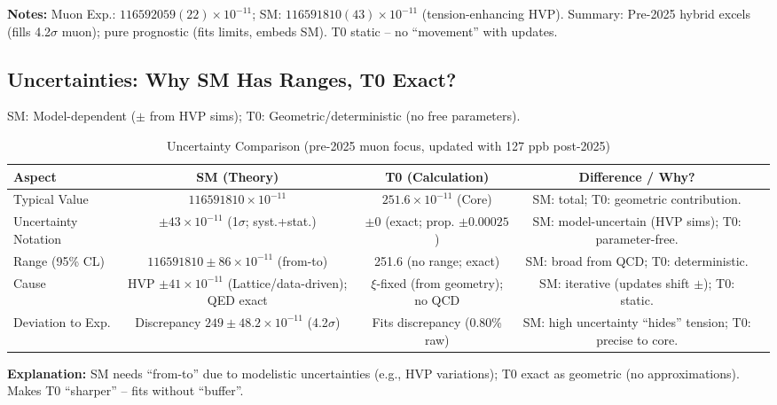 \documentclass[12pt,a4paper]{article}
\begin{document}
	\textbf{Notes:} Muon Exp.: $116592059(22) \times 10^{-11}$; SM: $116591810(43) \times 10^{-11}$ (tension-enhancing HVP). Summary: Pre-2025 hybrid excels (fills 4.2$\sigma$ muon); pure prognostic (fits limits, embeds SM). T0 static -- no ``movement'' with updates.
	
	\subsection{Uncertainties: Why SM Has Ranges, T0 Exact?}
	
	SM: Model-dependent ($\pm$ from HVP sims); T0: Geometric/deterministic (no free parameters).
	
	\begin{table}[ht!]
		\centering
		\small
		\begin{adjustbox}{max width=\textwidth}
			\begin{tabular}{lcccr}
				\toprule
				Aspect & SM (Theory) & T0 (Calculation) & Difference / Why? \\
				\midrule
				Typical Value & $116591810 \times 10^{-11}$ & $251.6 \times 10^{-11}$ (Core) & SM: total; T0: geometric contribution. \\
				Uncertainty Notation & $\pm 43 \times 10^{-11}$ (1$\sigma$; syst.+stat.) & $\pm 0$ (exact; prop. $\pm 0.00025$) & SM: model-uncertain (HVP sims); T0: parameter-free. \\
				Range (95\% CL) & $116591810 \pm 86 \times 10^{-11}$ (from-to) & 251.6 (no range; exact) & SM: broad from QCD; T0: deterministic. \\
				Cause & HVP $\pm 41 \times 10^{-11}$ (Lattice/data-driven); QED exact & $\xi$-fixed (from geometry); no QCD & SM: iterative (updates shift $\pm$); T0: static. \\
				Deviation to Exp. & Discrepancy $249 \pm 48.2 \times 10^{-11}$ (4.2$\sigma$) & Fits discrepancy (0.80\% raw) & SM: high uncertainty ``hides'' tension; T0: precise to core. \\
				\bottomrule
			\end{tabular}
		\end{adjustbox}
		\caption{Uncertainty Comparison (pre-2025 muon focus, updated with 127 ppb post-2025)}
		\label{tab:uncertainties}
	\end{table}
	
	\textbf{Explanation:} SM needs ``from-to'' due to modelistic uncertainties (e.g., HVP variations); T0 exact as geometric (no approximations). Makes T0 ``sharper'' -- fits without ``buffer''.
	
\end{document}
